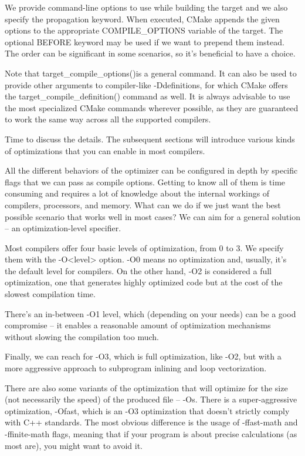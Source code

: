 We provide command-line options to use while building the target and we also specify the propagation keyword. When executed, CMake appends the given options to the appropriate COMPILE\_OPTIONS variable of the target. The optional BEFORE keyword may be used if we want to prepend them instead. The order can be significant in some scenarios, so it’s beneficial to have a choice.

Note that target\_compile\_options()is a general command. It can also be used to provide other arguments to compiler-like -Ddefinitions, for which CMake offers the target\_compile\_definition() command as well. It is always advisable to use the most specialized CMake commands wherever possible, as they are guaranteed to work the same way across all the supported compilers.

Time to discuss the details. The subsequent sections will introduce various kinds of optimizations that you can enable in most compilers.


All the different behaviors of the optimizer can be configured in depth by specific flags that we can pass as compile options. Getting to know all of them is time consuming and requires a lot of knowledge about the internal workings of compilers, processors, and memory. What can we do if we just want the best possible scenario that works well in most cases? We can aim for a general solution – an optimization-level specifier.

Most compilers offer four basic levels of optimization, from 0 to 3. We specify them with the -O<level> option. -O0 means no optimization and, usually, it’s the default level for compilers. On the other hand, -O2 is considered a full optimization, one that generates highly optimized code but at the cost of the slowest compilation time.

There’s an in-between -O1 level, which (depending on your needs) can be a good compromise – it enables a reasonable amount of optimization mechanisms without slowing the compilation too much.

Finally, we can reach for -O3, which is full optimization, like -O2, but with a more aggressive approach to subprogram inlining and loop vectorization.

There are also some variants of the optimization that will optimize for the size (not necessarily the speed) of the produced file – -Os. There is a super-aggressive optimization, -Ofast, which is an -O3 optimization that doesn’t strictly comply with C++ standards. The most obvious difference is the usage of -ffast-math and -ffinite-math flags, meaning that if your program is about precise calculations (as most are), you might want to avoid it.

